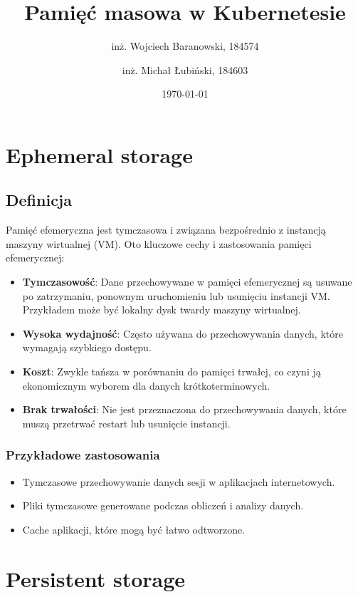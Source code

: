 \documentclass[polish,envcountsect,10pt]{article}
\title{Pamięć masowa w Kubernetesie}
\author{inż. Wojciech Baranowski, 184574 \and inż. Michał Łubiński, 184603}
\date{\today}
\begin{document}
\maketitle
\tableofcontents
\newpage

\section{Ephemeral storage}

\subsection{Definicja}

Pamięć efemeryczna jest tymczasowa i związana bezpośrednio z instancją maszyny wirtualnej (VM). Oto kluczowe cechy i zastosowania pamięci efemerycznej:

\begin{itemize}
    \item \textbf{Tymczasowość}: Dane przechowywane w pamięci efemerycznej są usuwane po zatrzymaniu, ponownym uruchomieniu lub usunięciu instancji VM. Przykładem może być lokalny dysk twardy maszyny wirtualnej.
    \item \textbf{Wysoka wydajność}: Często używana do przechowywania danych, które wymagają szybkiego dostępu.
    \item \textbf{Koszt}: Zwykle tańsza w porównaniu do pamięci trwałej, co czyni ją ekonomicznym wyborem dla danych krótkoterminowych.
    \item \textbf{Brak trwałości}: Nie jest przeznaczona do przechowywania danych, które muszą przetrwać restart lub usunięcie instancji.
\end{itemize}

\subsubsection{Przykładowe zastosowania}

\begin{itemize}
    \item Tymczasowe przechowywanie danych sesji w aplikacjach internetowych.
    \item Pliki tymczasowe generowane podczas obliczeń i analizy danych.
    \item Cache aplikacji, które mogą być łatwo odtworzone.
\end{itemize}

\section{Persistent storage}
\end{document}
